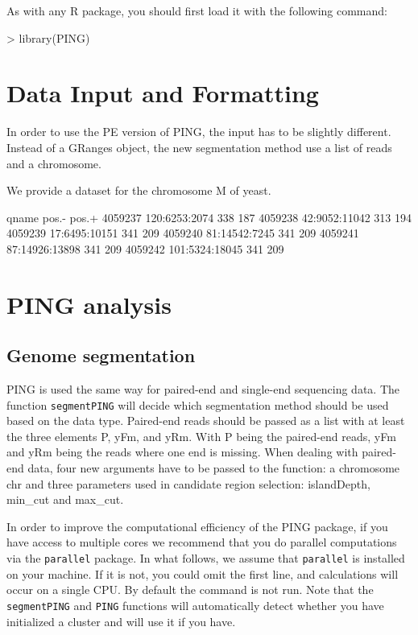 \documentclass[11pt]{article}
\begin{document}
As with any R package, you should first load it with the following command:

\begin{Schunk}
\begin{Sinput}
> library(PING)
\end{Sinput}
\end{Schunk}

\section{Data Input and Formatting}
In order to use the PE version of PING, the input has to be slightly different. Instead of a GRanges object, the new segmentation method use a list of reads and a chromosome.

We provide a dataset for the chromosome M of yeast.
\begin{Schunk}
\begin{Soutput}
                 qname pos.- pos.+
4059237  120:6253:2074   338   187
4059238  42:9052:11042   313   194
4059239  17:6495:10151   341   209
4059240  81:14542:7245   341   209
4059241 87:14926:13898   341   209
4059242 101:5324:18045   341   209
\end{Soutput}
\end{Schunk}


\section{PING analysis}

\subsection{Genome segmentation}
PING is used the same way for paired-end and single-end sequencing data. The function \texttt{segmentPING} will decide which segmentation method should be used based on the data type. Paired-end reads should be passed as a list with at least the three elements P, yFm, and yRm. With P being the paired-end reads, yFm and yRm being the reads where one end is missing.
When dealing with paired-end data, four new arguments have to be passed to the function: a chromosome chr and three parameters used in candidate region selection: islandDepth, min_cut and max_cut.

In order to improve the computational efficiency of the PING package, if you have access to multiple cores we recommend that you do parallel computations via the \texttt{parallel} package.
In what follows, we assume that \texttt{parallel} is installed on your machine. If it is not, you could omit the first line, and calculations will occur on a single CPU. 
By default the command is not run. Note that the \texttt{segmentPING} and \texttt{PING} functions will automatically detect whether you have initialized a cluster and will use it if you have. 
\end{document}
